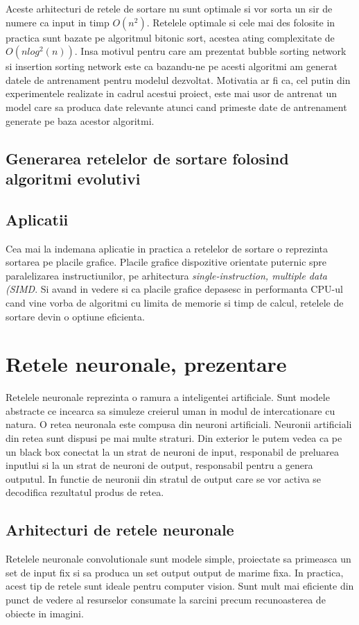 \documentclass[12pt]{article}
\begin{document}
    Aceste arhitecturi de retele de sortare nu sunt optimale si vor sorta un sir de numere ca input in timp
$O(n^2)$. Retelele optimale si cele mai des folosite in practica sunt bazate pe algoritmul bitonic sort, acestea ating complexitate de $O(nlog^2(n))$. Insa motivul pentru care am prezentat bubble sorting network si insertion sorting network este
ca bazandu-ne pe acesti algoritmi am generat datele de antrenament pentru modelul dezvoltat. Motivatia ar fi ca, cel putin din experimentele realizate in cadrul acestui proiect, este mai usor de antrenat un model care sa produca date relevante atunci cand primeste date de antrenament generate pe baza acestor algoritmi.

\subsection{Generarea retelelor de sortare folosind algoritmi evolutivi}

\subsection{Aplicatii}
Cea mai la indemana aplicatie in practica a retelelor de sortare o reprezinta sortarea pe placile grafice. Placile grafice dispozitive orientate puternic spre paralelizarea instructiunilor, pe arhitectura \textit{single-instruction, multiple data (SIMD}. Si avand in vedere si ca placile grafice depasesc in performanta CPU-ul cand vine vorba de algoritmi cu limita de memorie si timp de calcul, retelele de sortare devin o optiune eficienta.


\section{Retele neuronale, prezentare}

Retelele neuronale reprezinta o ramura a inteligentei artificiale. Sunt modele abstracte ce incearca sa simuleze creierul uman
in modul de intercationare cu natura. O retea neuronala este compusa din neuroni artificiali. Neuronii artificiali din retea sunt dispusi pe mai multe straturi. Din exterior le putem vedea ca pe un black box conectat la un strat de neuroni de input, responabil de preluarea inputlui si la un strat de neuroni de output, responsabil pentru a genera outputul. In functie de neuronii din stratul de output care se vor activa se decodifica rezultatul produs de retea.

\subsection{Arhitecturi de retele neuronale}
Retelele neuronale convolutionale sunt modele simple, proiectate sa primeasca un set de input fix si sa produca un set output output de marime fixa. In practica, acest tip de retele sunt ideale pentru computer vision. Sunt mult mai eficiente din punct de vedere al resurselor consumate la sarcini precum recunoasterea de obiecte in imagini. 
\end{document}

